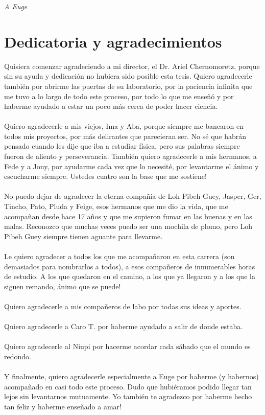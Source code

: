\hfill \textit{A Euge}
\chapter*{Dedicatoria y agradecimientos}
Quisiera comenzar agradeciendo a mi director, el Dr. Ariel Chernomoretz, porque sin su ayuda y dedicación no hubiera sido posible esta tesis. Quiero agradecerle también por abrirme las puertas de su laboratorio, por la paciencia infinita que me tuvo a lo largo de todo este proceso, por todo lo que me enseñó y por haberme ayudado a estar un poco más cerca de poder hacer ciencia.\\\\
Quiero agradecerle a mis viejos, Ima y Aba, porque siempre me bancaron en todos mis proyectos, por más delirantes que parecieran ser. No sé que habrán pensado cuando les dije que iba a estudiar física, pero sus palabras siempre fueron de aliento y perseverancia. También quiero agradecerle a mis hermanos, a Fede y a Jony, por ayudarme cada vez que lo necesité, por levantarme el ánimo y escucharme siempre. Ustedes cuatro son la base que me sostiene!\\\\
No puedo dejar de agradecer la eterna compañía de Loh Pibeh Guey, Jasper, Ger, Tincho, Pato, Pluda y Feige, esos hermanos que me dio la vida, que me acompañan desde hace 17 años y que me supieron fumar en las buenas y en las malas. Reconozco que muchas veces puedo ser una mochila de plomo, pero Loh Pibeh Guey siempre tienen aguante para llevarme.\\\\
Le quiero agradecer a todos los que me acompañaron en esta carrera (son demasiados para nombrarlos a todos), a esos compañeros de innumerables horas de estudio. A los que quedaron en el camino, a los que ya llegaron y a los que la siguen remando, ánimo que se puede!\\\\
Quiero agradecerle a mis compañeros de labo por todas sus ideas y aportes.\\\\
Quiero agradecerle a Caro T. por haberme ayudado a salir de donde estaba.\\\\
Quiero agradecerle al Niupi por hacerme acordar cada sábado que el mundo es redondo.\\\\
Y finalmente, quiero agradecerle especialmente a Euge por haberme (y habernos) acompañado en casi todo este proceso. Dudo que hubiéramos podido llegar tan lejos sin levantarnos mutuamente. Yo también te agradezco por haberme hecho tan feliz y haberme enseñado a amar!
